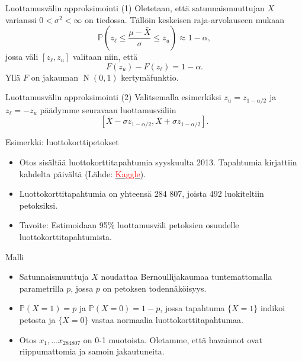 \documentclass{beamer}
\DeclareMathOperator{\n}{\mathrm N}
\begin{document}

\begin{frame}{Luottamusvälin approksimointi (1)}
  Oletetaan, että satunnaismuuttujan $X$ varianssi $0 < \sigma^2 < \infty$ on
  tiedossa. Tällöin keskeisen raja-arvolauseen mukaan
  \begin{equation*}
    \mathbb{P}\left(z_{\ell} \leq \frac{\mu - \bar X}{\sigma} \leq z_u\right) \approx 1 - \alpha,
  \end{equation*}
  \pause
  jossa väli $[z_\ell, z_u]$ valitaan niin, että
  \begin{equation*}
    F(z_u) - F(z_\ell) = 1-\alpha.
  \end{equation*}
  Yllä $F$ on jakauman $\n\left(0,1\right)$ kertymäfunktio.
\end{frame}


\begin{frame}{Luottamusvälin approksimointi (2)}
  Valitsemalla esimerkiksi $z_u = z_{1 - \alpha/2}$ ja $z_\ell = -z_u$ päädymme
  seuravaan luottamusväliin
  \begin{equation*}
    \left[\bar X - \sigma z_{1 - \alpha/2},
    \bar X + \sigma z_{1 - \alpha/2}\right].
  \end{equation*}
\end{frame}


\begin{frame}{Esimerkki: luottokorttipetokset}
  \begin{itemize}
    \item Otos sisältää luottokorttitapahtumia syyskuulta 2013. Tapahtumia
    kirjattiin kahdelta päivältä
    (Lähde: \href{https://www.kaggle.com/datasets/mlg-ulb/creditcardfraud?resource=download}{\textcolor{red}{Kaggle}}).
    \pause
    \item Luottokorttitapahtumia on yhteensä 284 807, joista 492 luokiteltiin
    petoksiksi.
    \pause
    \item Tavoite: Estimoidaan 95\% luottamusväli petoksien osuudelle
    luottokorttitapahtumista.
  \end{itemize}
\end{frame}


\begin{frame}{Malli}
  \begin{itemize}
    \item Satunnaismuuttuja $X$ noudattaa Bernoullijakaumaa tuntemattomalla
    parametrilla $p$, jossa $p$ on petoksen todennäköisyys.
    \item $\mathbb{P}\left(X = 1\right) = p$ ja $\mathbb{P}\left(X = 0\right) =
    1 - p$, jossa tapahtuma $\{X = 1\}$ indikoi petosta ja $\{X = 0\}$ vastaa
    normaalia luottokorttitapahtumaa.
    \item Otos $x_1, \ldots x_{284807}$ on 0-1 muotoista. Oletamme, että
    havainnot ovat riippumattomia ja samoin jakautuneita.
  \end{itemize}
\end{frame}
\end{document}
